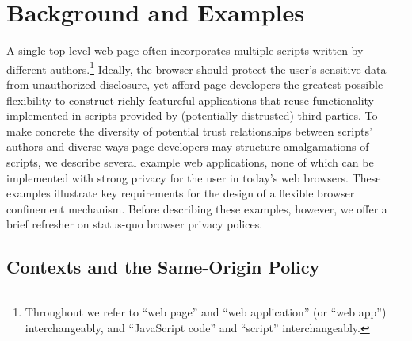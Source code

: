 \section{Background and Examples}

A single top-level web page often incorporates multiple scripts
written by different authors.\footnote{Throughout we refer to ``web
  page'' and ``web application'' (or ``web app'') interchangeably, and
  ``JavaScript code'' and ``script'' interchangeably.} Ideally, the
browser should protect the user's sensitive data from unauthorized
disclosure, yet afford page developers the greatest possible
flexibility to construct richly featureful applications that reuse
functionality implemented in scripts provided by (potentially
distrusted) third parties. To make concrete the diversity of potential
trust relationships between scripts' authors and diverse ways page
developers may structure amalgamations of scripts, we describe several
example web applications, none of which can be implemented with strong
privacy for the user in today's web browsers. These examples
illustrate key requirements for the design of a flexible browser
confinement mechanism. Before describing these examples, however, we
offer a brief refresher on status-quo browser privacy polices.

\subsection{Contexts and the Same-Origin Policy}
\label{sec:backgd}

